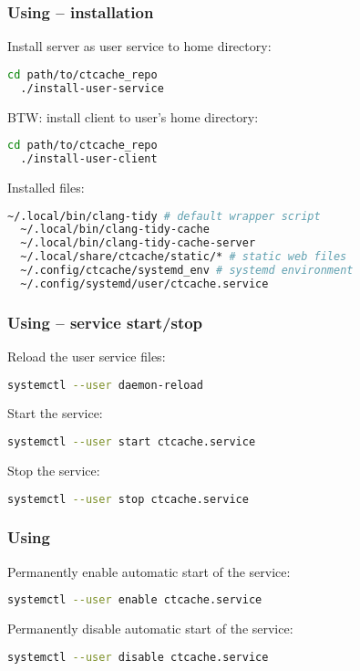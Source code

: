 \documentclass[compress,table,xcolor=table]{beamer}
\begin{document}
\begin{frame}[fragile]
  \frametitle{Using  -- installation}
  \Large
  Install server as user service to home directory:
  \begin{lstlisting}[language=bash]
  cd path/to/ctcache_repo
  ./install-user-service
  \end{lstlisting}
  BTW: install client to user's home directory:
  \begin{lstlisting}[language=bash]
  cd path/to/ctcache_repo
  ./install-user-client
  \end{lstlisting}
  Installed files:
  \begin{lstlisting}[language=bash,basicstyle=\footnotesize\ttfamily]
  ~/.local/bin/clang-tidy # default wrapper script
  ~/.local/bin/clang-tidy-cache
  ~/.local/bin/clang-tidy-cache-server
  ~/.local/share/ctcache/static/* # static web files
  ~/.config/ctcache/systemd_env # systemd environment
  ~/.config/systemd/user/ctcache.service
  \end{lstlisting}
\end{frame}
\begin{frame}[fragile]
  \frametitle{Using  -- service start/stop}
  \LARGE
  Reload the user service files:
  \begin{lstlisting}[language=bash]
  systemctl --user daemon-reload
  \end{lstlisting}
  Start the service:
  \begin{lstlisting}[language=bash]
  systemctl --user start ctcache.service
  \end{lstlisting}
  Stop the service:
  \begin{lstlisting}[language=bash]
  systemctl --user stop ctcache.service
  \end{lstlisting}
\end{frame}
\begin{frame}[fragile]
  \frametitle{Using }
  \LARGE
  Permanently enable automatic start of the service:
  \begin{lstlisting}[language=bash]
  systemctl --user enable ctcache.service
  \end{lstlisting}
  Permanently disable automatic start of the service:
  \begin{lstlisting}[language=bash]
  systemctl --user disable ctcache.service
  \end{lstlisting}
\end{frame}
\end{document}
